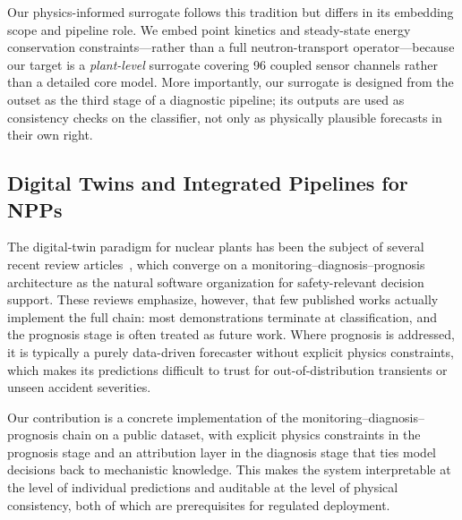 Our physics-informed surrogate follows this tradition but differs in its embedding scope and pipeline role. We embed point kinetics and steady-state energy conservation constraints---rather than a full neutron-transport operator---because our target is a \emph{plant-level} surrogate covering 96 coupled sensor channels rather than a detailed core model. More importantly, our surrogate is designed from the outset as the third stage of a diagnostic pipeline; its outputs are used as consistency checks on the classifier, not only as physically plausible forecasts in their own right.

\subsection{Digital Twins and Integrated Pipelines for NPPs}

The digital-twin paradigm for nuclear plants has been the subject of several recent review articles~\citep{ayodeji2022dtwin,digitaltwin2025review}, which converge on a monitoring--diagnosis--prognosis architecture as the natural software organization for safety-relevant decision support. These reviews emphasize, however, that few published works actually implement the full chain: most demonstrations terminate at classification, and the prognosis stage is often treated as future work. Where prognosis is addressed, it is typically a purely data-driven forecaster without explicit physics constraints, which makes its predictions difficult to trust for out-of-distribution transients or unseen accident severities.

Our contribution is a concrete implementation of the monitoring--diagnosis--prognosis chain on a public dataset, with explicit physics constraints in the prognosis stage and an attribution layer in the diagnosis stage that ties model decisions back to mechanistic knowledge. This makes the system interpretable at the level of individual predictions and auditable at the level of physical consistency, both of which are prerequisites for regulated deployment.
